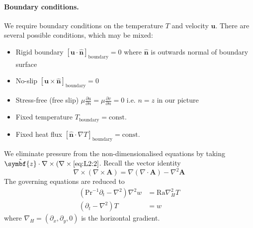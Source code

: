 \documentclass{jknotes}
\begin{document}
\paragraph{Boundary conditions.} We require boundary conditions on the
temperature $T$ and velocity $\symbf{u}$. There are several possible
conditions, which may be mixed:
\begin{itemize}
	\item Rigid boundary $\left[ \symbf{u}\cdot\hat{\symbf{n}}
		\right]_{\text{boundary}} = 0$ where $\hat{\symbf{n}}$ is outwards
		normal of boundary surface
	\item	No-slip $\left[ \symbf{u}\times\hat{\symbf{n}}
		\right]_{\text{boundary}} = 0$
	\item Stress-free (free slip) $\mu\frac{\partial u}{\partial n} = \mu
		\frac{\partial v}{\partial n} = 0$ i.e. $n=z$ in our picture
	\item Fixed temperature $T_{\text{boundary}} = \text{const.}$
	\item Fixed heat flux $\left[ \hat{\symbf{n}}\cdot\nabla
				T\right]_{\text{boundary}} = \text{const.}$
\end{itemize}

We eliminate pressure from the non-dimensionalised equations by taking
$\hat{\symbf{z}}\cdot\nabla \times (\nabla \times \eqref{eq:L2:2}$. Recall the
vector identity
\begin{equation}
	\nabla \times (\nabla \times \symbf{A}) = \nabla (\nabla \cdot \symbf{A})
	- \nabla^2 \symbf{A}
\end{equation}
The governing equations are reduced to
\begin{align}
	\left( \text{Pr}^{-1} \partial_t - \nabla^2 \right) \nabla^2 w &=
	\text{Ra} \nabla^2_H T \label{eq:L2:4}\\
	\left( \partial_t - \nabla^2 \right) T &= w \label{eq:L2:5}
\end{align}
where $\nabla_H = (\partial_x, \partial_y, 0)$ is the horizontal gradient.
\end{document}
